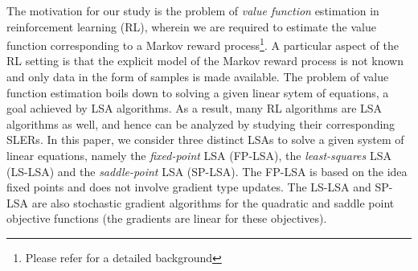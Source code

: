 The motivation for our study is the problem of \emph{value function} estimation in reinforcement learning (RL), wherein we are required to estimate the value function corresponding to a Markov reward process\footnote{Please refer \cite{BertB} for a detailed background}. A particular aspect of the RL setting is that the explicit model of the Markov reward process is not known and only data in the form of samples is made available. The problem of value function estimation boils down to solving a given linear sytem of equations, a goal achieved by LSA algorithms. As a result, many RL algorithms are LSA algorithms as well, and hence can be analyzed by studying their corresponding SLERs. In this paper, we consider three distinct LSAs to solve a given system of linear equations, namely the \emph{fixed-point} LSA (FP-LSA), the \emph{least-squares} LSA (LS-LSA) and the \emph{saddle-point} LSA (SP-LSA). The FP-LSA is based on the idea fixed points and does not involve gradient type updates.  The LS-LSA and SP-LSA are also stochastic gradient algorithms for the quadratic and saddle point objective functions (the gradients are linear for these objectives).

